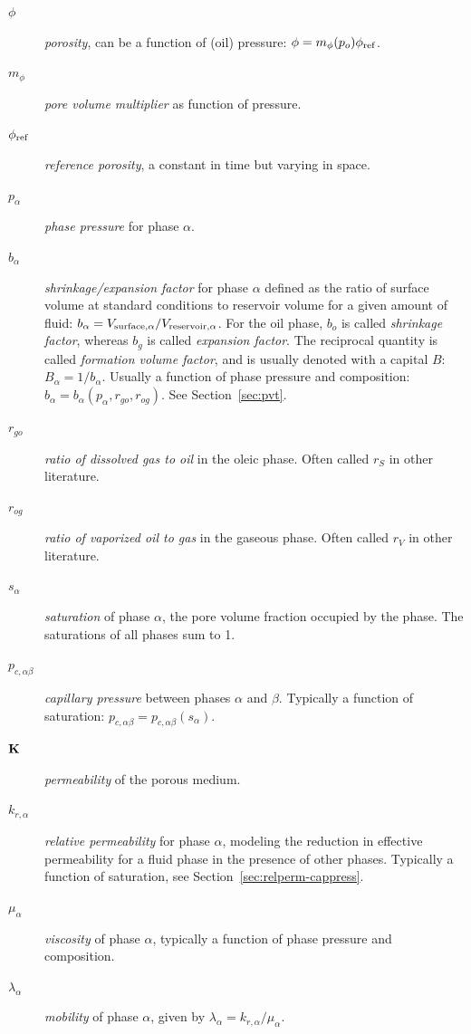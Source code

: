 \begin{description}
\item[$\phi$] {\em porosity}, can be a function of (oil) pressure:
  $\phi = m_\phi(p_o)\phi_{\rm ref}$.
\item[$m_\phi$] {\em pore volume multiplier} as function of pressure.
\item[$\phi_{\rm ref}$] {\em reference porosity}, a constant in time
  but varying in space.
\item[$p_\alpha$] {\em phase pressure} for phase $\alpha$.
\item[$b_\alpha$] {\em shrinkage/expansion factor} for phase $\alpha$
  defined as the ratio of surface volume at standard conditions
  to reservoir volume for a given amount of fluid:
  $b_\alpha = V_{\rm{surface}, \alpha}/V_{\rm{reservoir}, \alpha}$.
  For the oil phase, $b_o$ is called {\em shrinkage factor}, whereas
  $b_g$ is called {\em expansion factor}.
  The reciprocal quantity is called {\em formation volume
  factor}, and is usually denoted with a capital $B$:
  $B_\alpha = 1/b_\alpha$.  Usually a function of phase pressure and
  composition: $b_\alpha = b_\alpha(p_\alpha, r_{go}, r_{og})$. See
  Section~\ref{sec:pvt}.
\item[$r_{go}$] {\em ratio of dissolved gas to oil} in the oleic
  phase. Often called $r_S$ in other literature.
\item[$r_{og}$] {\em ratio of vaporized oil to gas} in the gaseous
  phase. Often called $r_V$ in other literature.
\item[$s_\alpha$] {\em saturation} of phase $\alpha$, the pore volume
  fraction occupied by the phase. The saturations of all phases sum to 1.
\item[$p_{c,\alpha \beta}$] {\em capillary pressure} between phases
  $\alpha$ and $\beta$. Typically a function of
  saturation: $p_{c,\alpha\beta} = p_{c,\alpha\beta}(s_\alpha)$.
\item[${\bf K}$] {\em permeability} of the porous medium.
\item[$k_{r,\alpha}$] {\em relative permeability} for phase $\alpha$,
  modeling the reduction in effective permeability for a fluid phase
  in the presence of other phases. Typically a function of saturation,
  see Section~\ref{sec:relperm-cappress}.
\item[$\mu_\alpha$] {\em viscosity} of phase $\alpha$, typically a
  function of phase pressure and composition.
\item[$\lambda_\alpha$] {\em mobility} of phase $\alpha$, given by
  $\lambda_\alpha = k_{r,\alpha}/\mu_\alpha$.

\end{description}
